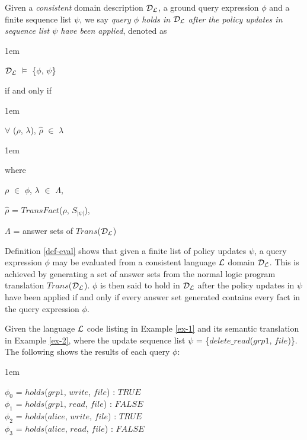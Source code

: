 \documentclass[global,twocolumn,final]{svjour}
\newenvironment{vdefinition}
  {\begin{definition}\hspace{0.25em}}
  {\end{definition}}
\newenvironment{vexample}
  {\begin{example}\hspace{0.25em}}
  {\end{example}}
\newenvironment{vquote}
  {\begin{list}{}{\leftmargin 1em}\item[]}
  {\end{list}}
\begin{document}
    \begin{vdefinition}
      \label{def-eval}
      Given a {\em consistent} domain description ${\cal D}_{\cal L}$, a ground
      query expression $\phi$ and a finite sequence list $\psi$, we say
      {\em query $\phi$ holds in ${\cal D}_{\cal L}$ after the policy updates
      in sequence list $\psi$ have been applied}, denoted as

      \begin{vquote}
        ${\cal D}_{\cal L}$ $\models$ \{$\phi$, $\psi$\}
      \end{vquote}

      \noindent
      if and only if

      \begin{vquote}
        $\forall$ ($\rho$, $\lambda$),
        $\hat{\rho}$ $\in$ $\lambda$

      \end{vquote}

      \begin{vquote}
        where

        $\rho$ $\in$ $\phi$,
        $\lambda$ $\in$ $\Lambda$,

        $\hat{\rho}$ = $TransFact$($\rho$, $S_{|\psi|}$),

        $\Lambda$ = answer sets of $Trans$(${\cal D}_{\cal L}$)
      \end{vquote}
    \end{vdefinition}

    Definition \ref{def-eval} shows that given a finite list of policy updates
    $\psi$, a query expression $\phi$ may be evaluated from a consistent
    language ${\cal L}$ domain ${\cal D_{L}}$. This is achieved by generating a
    set of answer sets from the normal logic program translation
    $Trans$(${\cal D_{L}}$). $\phi$ is then said to hold in ${\cal D_{L}}$
    after the policy updates in $\psi$ have been applied if and only if every
    answer set generated contains every fact in the query expression $\phi$.

    \begin{vexample}
      \label{ex-3}
      Given the language ${\cal L}$ code listing in Example \ref{ex-1} and its
      semantic translation in Example \ref{ex-2}, where the update sequence
      list $\psi$ = \{$delete\_read$($grp1$, $file$)\}. The following shows the
      results of each query $\phi$:

      \begin{vquote}
        $\phi_{0}$ = $holds$($grp1$, $write$, $file$) : $TRUE$ \\
        $\phi_{1}$ = $holds$($grp1$, $read$, $file$) : $FALSE$ \\
        $\phi_{2}$ = $holds$($alice$, $write$, $file$) : $TRUE$ \\
        $\phi_{3}$ = $holds$($alice$, $read$, $file$) : $FALSE$
      \end{vquote}
    \end{vexample}
\end{document}
